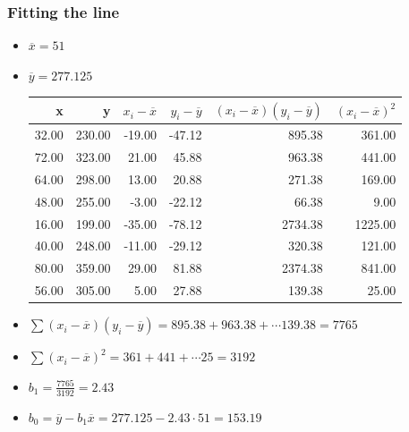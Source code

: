 \documentclass[handout]{beamer}
\providecommand{\ov}[1]{\overline{#1}}
\numberwithin{equation}{section}
\begin{document}
\begin{frame}
\frametitle{Fitting the line} \scriptsize
\begin{itemize}
\pause \item $\ov{x} = 51$
\pause \item $\ov{y} = 277.125$ \pause
\begin{table}[ht]
\centering
\begin{tabular}{rrrrrr}
 x & y & $x_i - \ov{x}$ & $y_i - \ov{y}$ & $(x_i - \ov{x})(y_i - \ov{y})$ & $(x_i - \ov{x})^2$ \\ 
  \hline
32.00 & 230.00 & -19.00 & -47.12 & 895.38 & 361.00 \\ 
  72.00 & 323.00 & 21.00 & 45.88 & 963.38 & 441.00 \\ 
  64.00 & 298.00 & 13.00 & 20.88 & 271.38 & 169.00 \\ 
  48.00 & 255.00 & -3.00 & -22.12 & 66.38 & 9.00 \\ 
  16.00 & 199.00 & -35.00 & -78.12 & 2734.38 & 1225.00 \\ 
  40.00 & 248.00 & -11.00 & -29.12 & 320.38 & 121.00 \\ 
  80.00 & 359.00 & 29.00 & 81.88 & 2374.38 & 841.00 \\ 
  56.00 & 305.00 & 5.00 & 27.88 & 139.38 & 25.00 \\ 
  \end{tabular}
\end{table}\pause \item $\sum (x_i - \ov{x})(y_i - \ov{y}) = 895.38 +  963.38  + \cdots  139.38  =  7765 $
\pause \item $\sum (x_i - \ov{x})^2= 361 +  441  + \cdots  25  =  3192 $
\pause \item $b_1 = \frac{7765}{3192} = 2.43$
\pause \item $b_0 = \ov{y} - b_1 \ov{x} = 277.125 - 2.43 \cdot 51 = 153.19$
\end{itemize}
\end{frame}
\end{document}

